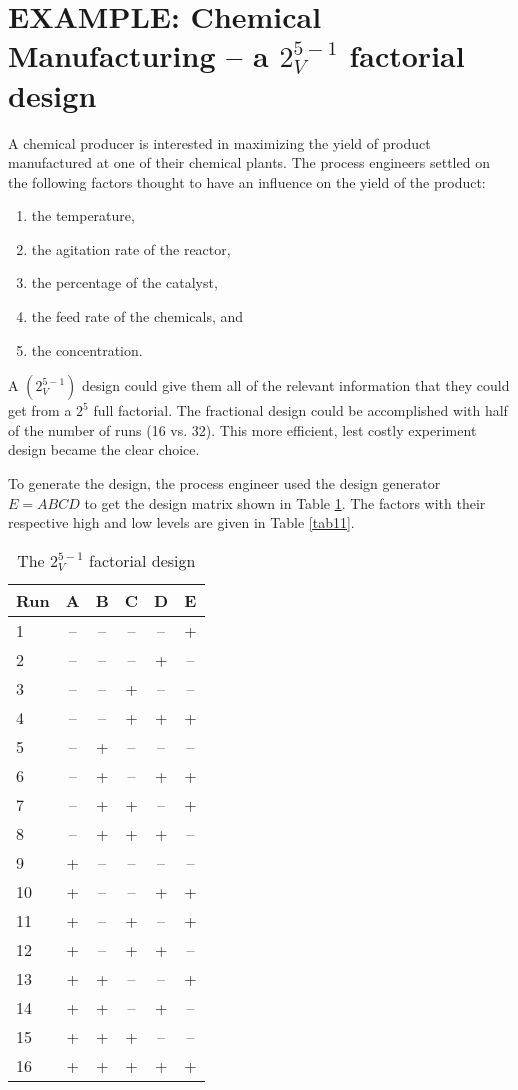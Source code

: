 \section{EXAMPLE: Chemical Manufacturing -- a $2^{5-1}_{V}$ factorial design}
A chemical producer is interested in maximizing the yield of product manufactured at one of their chemical plants. The process engineers settled on the following factors thought to have an influence on the yield of the product:
\begin{enumerate}
\item the temperature,
\item the agitation rate of the reactor,
\item the percentage of the catalyst, 
\item the feed rate of the chemicals, and
\item the concentration.
\end{enumerate}

A $(2^{5-1}_{V})$ design could give them all of the relevant information that they could get from a $2^{5}$ full factorial. The fractional design could be accomplished with half of the number of runs (16 vs. 32).  This more efficient, lest costly experiment design became the clear choice.

To generate the design, the process engineer used the design generator $E = ABCD$ to get the design matrix shown in Table \ref{tab10}.  The factors with their respective high and low levels are given in Table \ref{tab11}.

\begin{table}[h]\caption{The $2^{5-1}_{V}$ factorial design}\label{tab10}
\begin{center}
\begin{tabular}{|l|c|c|c|c|c|}
\hline Run& A  & B  & C  & D  & E  \\ 
\hline 1  & -- & -- & -- & -- & +  \\ 
\hline 2  & -- & -- & -- & +  & -- \\ 
\hline 3  & -- & -- & +  & -- & -- \\ 
\hline 4  & -- & -- & +  & +  & +  \\
\hline 5  & -- & +  & -- & -- & -- \\
\hline 6  & -- & +  & -- & +  & +  \\
\hline 7  & -- & +  & +  & -- & +  \\
\hline 8  & -- & +  & +  & +  & -- \\ 
\hline 9  & +  & -- & -- & -- & -- \\ 
\hline 10 & +  & -- & -- & +  & +  \\ 
\hline 11 & +  & -- & +  & -- & +  \\ 
\hline 12 & +  & -- & +  & +  & -- \\
\hline 13 & +  & +  & -- & -- & +  \\
\hline 14 & +  & +  & -- & +  & -- \\
\hline 15 & +  & +  & +  & -- & -- \\
\hline 16 & +  & +  & +  & +  & +  \\ 
\hline 
\end{tabular} 
\end{center}
\end{table}

